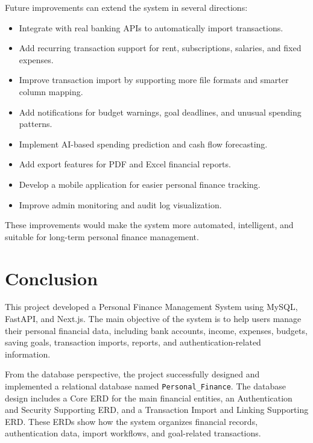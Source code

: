 ﻿\documentclass{article}
\begin{document}
Future improvements can extend the system in several directions:

\begin{itemize}
    \item Integrate with real banking APIs to automatically import transactions.
    \item Add recurring transaction support for rent, subscriptions, salaries, and fixed expenses.
    \item Improve transaction import by supporting more file formats and smarter column mapping.
    \item Add notifications for budget warnings, goal deadlines, and unusual spending patterns.
    \item Implement AI-based spending prediction and cash flow forecasting.
    \item Add export features for PDF and Excel financial reports.
    \item Develop a mobile application for easier personal finance tracking.
    \item Improve admin monitoring and audit log visualization.
\end{itemize}

These improvements would make the system more automated, intelligent, and suitable for long-term personal finance management.

\section{Conclusion}
\label{sec:conclusion}

This project developed a Personal Finance Management System using MySQL, FastAPI, and Next.js. The main objective of the system is to help users manage their personal financial data, including bank accounts, income, expenses, budgets, saving goals, transaction imports, reports, and authentication-related information.

From the database perspective, the project successfully designed and implemented a relational database named \texttt{Personal\_Finance}. The database design includes a Core ERD for the main financial entities, an Authentication and Security Supporting ERD, and a Transaction Import and Linking Supporting ERD. These ERDs show how the system organizes financial records, authentication data, import workflows, and goal-related transactions.
\end{document}
